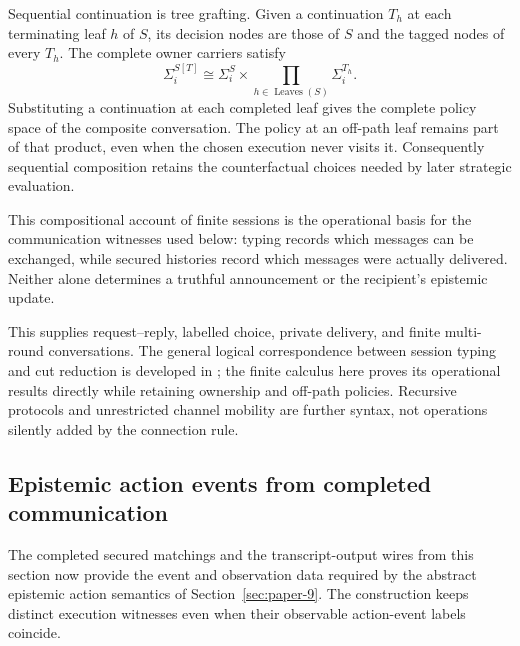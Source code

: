 \documentclass[11pt,a4paper]{article}
\numberwithin{equation}{section}
\theoremstyle{definition}
\theoremstyle{remark}
\theoremstyle{plain}
\begin{document}
Sequential continuation is tree grafting. Given a continuation $T_h$ at
each terminating leaf $h$ of $S$, its decision nodes are those of $S$ and
the tagged nodes of every $T_h$. The complete owner carriers satisfy
\[
 \Sigma_i^{S[T]}\cong
 \Sigma_i^S\times\prod_{h\in\operatorname{Leaves}(S)}\Sigma_i^{T_h}.
\]
Substituting a continuation at each completed leaf gives the
complete policy space of the composite conversation. The policy at an
off-path leaf remains part of that product, even when the chosen execution
never visits it. Consequently sequential composition retains the
counterfactual choices needed by later strategic evaluation.

This compositional account of finite sessions is the operational
basis for the communication witnesses used below: typing records which
messages can be exchanged, while secured histories record which
messages were actually delivered. Neither alone determines a truthful
announcement or the recipient's epistemic update.

This supplies request--reply, labelled choice, private delivery, and finite
multi-round conversations. The general logical correspondence between session
typing and cut reduction is developed in \citet{agt-CairesEtAl}; the finite
calculus here proves its operational results directly while retaining
ownership and off-path policies. Recursive protocols and unrestricted channel
mobility are further syntax, not operations silently added by the connection
rule.


\subsection{Epistemic action events from completed communication}
\label{sec:egt-implemented-action-events}

The completed secured matchings and the transcript-output wires from
this section now provide the event and observation data required by the
abstract epistemic action semantics of Section~\ref{sec:paper-9}.
The construction keeps distinct execution witnesses even when their
observable action-event labels coincide.
\end{document}
